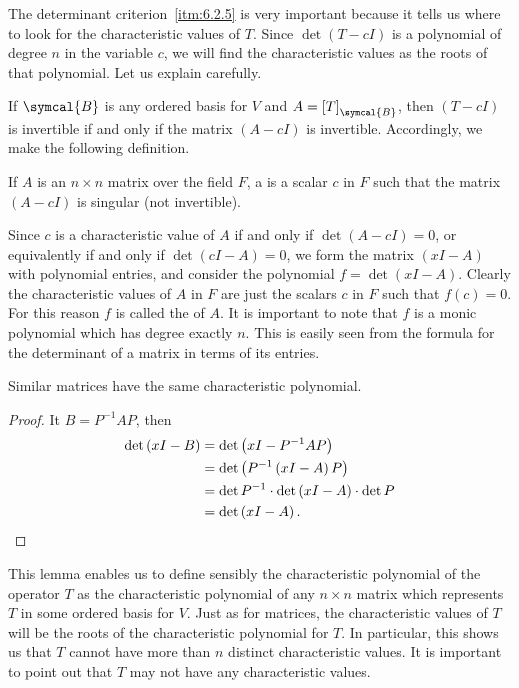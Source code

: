 The determinant criterion~\ref{itm:6.2.5} is very important because it tells us where to look for the characteristic values of \(T\). Since \(\det\left(T-cI\right)\) is a polynomial of degree \(n\) in the variable \(c\), we will find the characteristic values as the roots of that polynomial. Let us explain carefully.

If \(\symcal{B}\) is any ordered basis for \(V\) and \(A=\left[T\right]_{\symcal{B}}\), then \(\left(T-cI\right)\) is invertible if and only if the matrix \(\left(A-cI\right)\) is invertible. Accordingly, we make the following definition.

\begin{definition}
    If \(A\) is an \(n\times n\) matrix over the field \(F\), a  is a scalar \(c\) in \(F\) such that the matrix \(\left(A-cI\right)\) is singular (not invertible).
\end{definition}

Since \(c\) is a characteristic value of \(A\) if and only if \(\det\left(A-cI\right)=0\), or equivalently if and only if \(\det\left(cI-A\right)=0\), we form the matrix \(\left(xI-A\right)\) with polynomial entries, and consider the polynomial \(f=\det\left(xI-A\right)\). Clearly the characteristic values of \(A\) in \(F\) are just the scalars \(c\) in \(F\) such that \(f\left(c\right)=0\). For this reason \(f\) is called the  of \(A\). It is important to note that \(f\) is a monic polynomial which has degree exactly \(n\). This is easily seen from the formula for the determinant of a matrix in terms of its entries.

\begin{lemma}
    Similar matrices have the same characteristic polynomial.
\end{lemma}

\begin{proof}
    It \(B=P^{-1}AP\), then
    \begin{align*}
        \det\left(xI-B\right)&=\det\left(xI-P^{-1}AP\right)\\
        &=\det\left(P^{-1}\left(xI-A\right)P\right)\\
        &=\det P^{-1}\cdot\det\left(xI-A\right)\cdot\det P\\
        &=\det\left(xI-A\right).\qedhere
    \end{align*}
\end{proof}

This lemma enables us to define sensibly the characteristic polynomial of the operator \(T\) as the characteristic polynomial of any \(n\times n\) matrix which represents \(T\) in some ordered basis for \(V\). Just as for matrices, the characteristic values of \(T\) will be the roots of the characteristic polynomial for \(T\). In particular, this shows us that \(T\) cannot have more than \(n\) distinct characteristic values. It is important to point out that \(T\) may not have any characteristic values.

